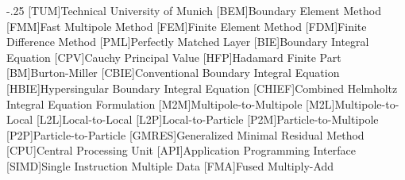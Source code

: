 \documentclass[headsepline,footsepline,footinclude=false,oneside,fontsize=11pt,paper=a4,listof=totoc,bibliography=totoc]{scrbook} %
\begin{document}


\frontmatter{}



% 

\tableofcontents{}
\begin{acronym}
	\itemsep-.25\baselineskip
	[TUM]{Technical University of Munich}
	[BEM]{Boundary Element Method}
	[FMM]{Fast Multipole Method}
	[FEM]{Finite Element Method}
	[FDM]{Finite Difference Method}
	[PML]{Perfectly Matched Layer}
	[BIE]{Boundary Integral Equation}
	[CPV]{Cauchy Principal Value}
	[HFP]{Hadamard Finite Part}
	[BM]{Burton-Miller}
	[CBIE]{Conventional Boundary Integral Equation}
	[HBIE]{Hypersingular Boundary Integral Equation}
	[CHIEF]{Combined Helmholtz Integral Equation Formulation}
	[M2M]{Multipole-to-Multipole}
	[M2L]{Multipole-to-Local}
	[L2L]{Local-to-Local}
	[L2P]{Local-to-Particle}
	[P2M]{Particle-to-Multipole}
	[P2P]{Particle-to-Particle}
	[GMRES]{Generalized Minimal Residual Method}
	[CPU]{Central Processing Unit}
	[API]{Application Programming Interface}
	[SIMD]{Single Instruction Multiple Data}
	[FMA]{Fused Multiply-Add}
\end{acronym}
\glsaddall
\printglossary[title=List of Symbols, toctitle=List of Symbols]

\mainmatter{}








\appendix{}




\listoffigures{}
\listoftables{}
\printbibliography{}


\end{document}
